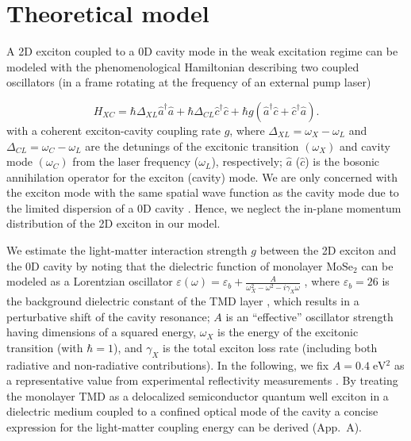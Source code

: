 \documentclass{achemso}
\begin{document}
\section{Theoretical model}
A 2D exciton coupled to a 0D cavity mode in the weak excitation regime can be modeled with the phenomenological Hamiltonian describing two coupled oscillators (in a frame rotating at the frequency of an external pump laser) \cite{gerace_quantum_2007, deng_exciton-polariton_2010}

\begin{equation}\label{ham}
	H_{XC} = \hbar \Delta_{XL} \hat{a}^{\dagger} \hat{a} + \hbar \Delta_{CL} \hat{c}^{\dagger} \hat{c} + \hbar g (\hat{a}^{\dagger} \hat{c} + \hat{c}^{\dagger} \hat{a}).
\end{equation}
with a coherent exciton-cavity coupling rate $g$, where $\Delta_{XL} = \omega_{X} - \omega_{L}$ and $\Delta_{CL} = \omega_{C} - \omega_{L}$ are the detunings of the excitonic transition $(\omega_X)$ and cavity mode $(\omega_C)$ from the laser frequency ($\omega_{L}$), respectively; $\hat{a}$ ($\hat{c}$) is the bosonic annihilation operator for the exciton (cavity) mode. We are only concerned with the exciton mode with the same spatial wave function as the cavity mode due to the limited dispersion of a 0D cavity \cite{verger_polariton_2006}. Hence, we neglect the in-plane momentum distribution of the 2D exciton in our model.

We estimate the light-matter interaction strength $g$ between the 2D exciton and the 0D cavity by noting that the dielectric function of monolayer $\mathrm{MoSe}_{2}$ can be modeled as a Lorentzian oscillator $\varepsilon (\omega) = \varepsilon_{b} + \frac{A}{\omega_{X}^{2} - \omega^{2} - i \gamma_{X} \omega}$ \cite{lundt_monolayered_2016}, where $\varepsilon_{b} = 26$ is the background dielectric constant of the TMD layer \cite{morozov_optical_2015}, which results in a perturbative shift of the cavity resonance; $A$ is an ``effective'' oscillator strength having dimensions of a squared energy, $\omega_{X}$ is the energy of the excitonic transition (with $\hbar=1$), and $\gamma_{X}$ is the total exciton loss rate (including both radiative and non-radiative contributions). In the following, we fix $A = 0.4 \; \si{\electronvolt^{2}}$ as a representative value from experimental reflectivity measurements \cite{lundt_monolayered_2016}. By treating the monolayer TMD as a delocalized semiconductor quantum well exciton in a dielectric medium coupled to a confined optical mode of the cavity a concise expression for the light-matter coupling energy can be derived (App.~A).
\end{document}
